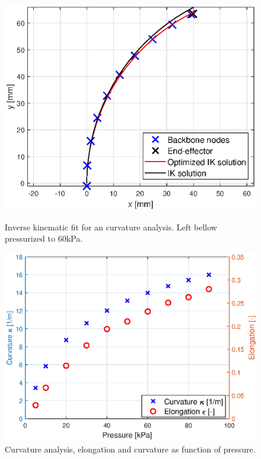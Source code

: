 \begin{figure}[H]
\begin{minipage}{0.5\textwidth}
        \label{fig3:nodalcurvatrue}
    \end{minipage}
\begin{minipage}{0.5\textwidth}
        \centering
        \includegraphics[width=\textwidth]{Figures/Chapter3/rot60kpa.eps}
        \caption{Inverse kinematic fit for an curvature analysis. Left bellow pressurized to 60kPa.}
        \label{fig3:nodalfitcurv}
    \end{minipage}\hfill
    \begin{minipage}{0.5\textwidth}
        \centering
        \includegraphics[width=\textwidth]{Figures/Chapter3/curvanalysiscurveps.eps} 
        \caption{Curvature analysis, elongation and curvature as function of pressure.}
        \label{fig3:rotationvspressure}
    \end{minipage}
\end{figure}


